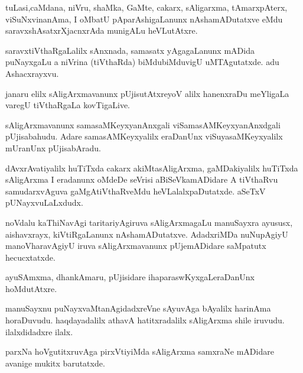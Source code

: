 \documentclass{article}
\begin{document}
\begin{mn}%
tuLasi,caMdana, niVru, shaMka, GaMte, cakarx, sAligarxma, tAmarxpAterx, viSuNxvinanAma, I 
oMbatU pAparAshigaLanunx nAshamADutatxve eMdu saravxshAsatxrXjacnxrAda munigALu heVLutAtxre.
\end{mn}

\begin{mn}%
saravxtiVthaRgaLalilx sAnxnada, samasatx yAgagaLanunx mADida puNayxgaLu a niVrina (tiVthaRda)
biMdubiMduvigU uMTAgutatxde. adu Ashacxrayxvu.
\end{mn}

\begin{mn}%
janaru elilx sAligArxmavanunx pUjisutAtxreyoV alilx hanenxraDu meYligaLa varegU 
tiVthaRgaLa kovTigaLive.
\end{mn}

\begin{mn}%
sAligArxmavanunx samasaMKeyxyanAnxgali viSamasAMKeyxyanAnxdgali pUjisabahudu. Adare 
samasAMKeyxyalilx eraDanUnx viSuyasaMKeyxyalilx mUranUnx pUjisabAradu.
\end{mn}

\begin{mn}%
dAvxrAvatiyalilx huTiTxda cakarx akiMtasAligArxma, gaMDakiyalilx huTiTxda sAligArxma I 
eradanunx oMdeDe seVrisi aBiSeVkamADidare A tiVthaRvu samudarxvAguva gaMgAtiVthaRveMdu 
heVLalalxpaDutatxde. aSeTxV pUNayxvuLaLxdudx.
\end{mn}

\begin{mn}%
noVdalu kaThiNavAgi taritariyAgiruva sAligArxmagaLu manuSayxra ayususx, aishavxrayx, 
kiVtiRgaLanunx nAshamADutatxve. AdadxriMDa nuNupAgiyU manoVharavAgiyU iruva 
sAligArxmavanunx pUjemADidare saMpatutx hecucxtatxde.
\end{mn}

\begin{mn}%
ayuSAmxma, dhankAmaru, pUjisidare ihaparaswKyxgaLeraDanUnx hoMdutAtxre.
\end{mn}

\begin{mn}%
manuSayxnu puNayxvaMtanAgidadxreVne sAyuvAga bAyalilx harinAma horaDuvudu. haqdayadalilx 
athavA hatitxradalilx sAligArxma shile iruvudu. ilalxdidadxre ilalx.
\end{mn}

\begin{mn}%
parxNa hoVgutitxruvAga pirxVtiyiMda sAligArxma samxraNe mADidare avanige mukitx barutatxde.
\end{mn}
\end{document}
